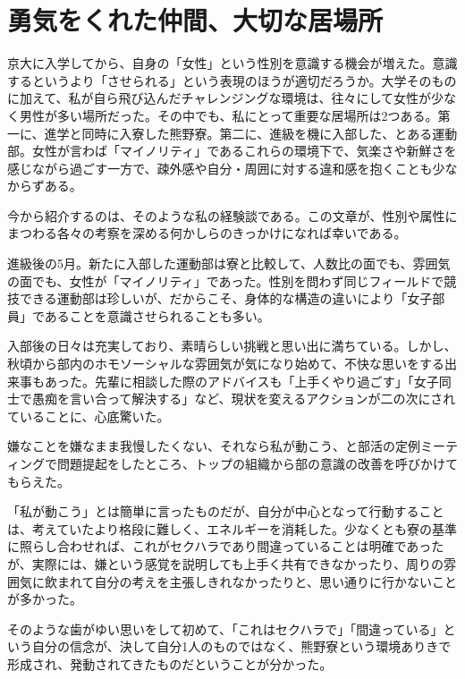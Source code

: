 \section{勇気をくれた仲間、大切な居場所}
京大に入学してから、自身の「女性」という性別を意識する機会が増えた。意識するというより「させられる」という表現のほうが適切だろうか。大学そのものに加えて、私が自ら飛び込んだチャレンジングな環境は、往々にして女性が少なく男性が多い場所だった。その中でも、私にとって重要な居場所は2つある。第一に、進学と同時に入寮した熊野寮。第二に、進級を機に入部した、とある運動部。女性が言わば「マイノリティ」であるこれらの環境下で、気楽さや新鮮さを感じながら過ごす一方で、疎外感や自分・周囲に対する違和感を抱くことも少なからずある。


\par 今から紹介するのは、そのような私の経験談である。この文章が、性別や属性にまつわる各々の考察を深める何かしらのきっかけになれば幸いである。


\par 進級後の5月。新たに入部した運動部は寮と比較して、人数比の面でも、雰囲気の面でも、女性が「マイノリティ」であった。性別を問わず同じフィールドで競技できる運動部は珍しいが、だからこそ、身体的な構造の違いにより「女子部員」であることを意識させられることも多い。


\par 入部後の日々は充実しており、素晴らしい挑戦と思い出に満ちている。しかし、秋頃から部内のホモソーシャルな雰囲気が気になり始めて、不快な思いをする出来事もあった。先輩に相談した際のアドバイスも「上手くやり過ごす」「女子同士で愚痴を言い合って解決する」など、現状を変えるアクションが二の次にされていることに、心底驚いた。


\par 嫌なことを嫌なまま我慢したくない、それなら私が動こう、と部活の定例ミーティングで問題提起をしたところ、トップの組織から部の意識の改善を呼びかけてもらえた。


\par 「私が動こう」とは簡単に言ったものだが、自分が中心となって行動することは、考えていたより格段に難しく、エネルギーを消耗した。少なくとも寮の基準に照らし合わせれば、これがセクハラであり間違っていることは明確であったが、実際には、嫌という感覚を説明しても上手く共有できなかったり、周りの雰囲気に飲まれて自分の考えを主張しきれなかったりと、思い通りに行かないことが多かった。


\par そのような歯がゆい思いをして初めて、「これはセクハラで」「間違っている」という自分の信念が、決して自分1人のものではなく、熊野寮という環境ありきで形成され、発動されてきたものだということが分かった。



